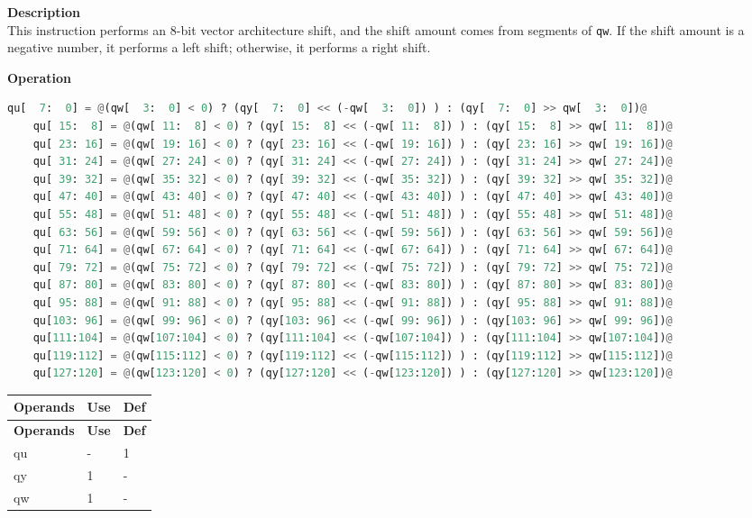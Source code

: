 \textbf{Description}\\
This instruction performs an 8-bit vector architecture shift, and the shift amount comes from segments of \lstinline{qw}. If the shift amount is a negative number, it performs a left shift; otherwise, it performs a right shift.

\textbf{Operation}\\
\begin{lstlisting}[language=Python, escapechar=@]
    qu[  7:  0] = @(qw[  3:  0] < 0) ? (qy[  7:  0] << (-qw[  3:  0]) ) : (qy[  7:  0] >> qw[  3:  0])@
    qu[ 15:  8] = @(qw[ 11:  8] < 0) ? (qy[ 15:  8] << (-qw[ 11:  8]) ) : (qy[ 15:  8] >> qw[ 11:  8])@
    qu[ 23: 16] = @(qw[ 19: 16] < 0) ? (qy[ 23: 16] << (-qw[ 19: 16]) ) : (qy[ 23: 16] >> qw[ 19: 16])@
    qu[ 31: 24] = @(qw[ 27: 24] < 0) ? (qy[ 31: 24] << (-qw[ 27: 24]) ) : (qy[ 31: 24] >> qw[ 27: 24])@
    qu[ 39: 32] = @(qw[ 35: 32] < 0) ? (qy[ 39: 32] << (-qw[ 35: 32]) ) : (qy[ 39: 32] >> qw[ 35: 32])@
    qu[ 47: 40] = @(qw[ 43: 40] < 0) ? (qy[ 47: 40] << (-qw[ 43: 40]) ) : (qy[ 47: 40] >> qw[ 43: 40])@
    qu[ 55: 48] = @(qw[ 51: 48] < 0) ? (qy[ 55: 48] << (-qw[ 51: 48]) ) : (qy[ 55: 48] >> qw[ 51: 48])@
    qu[ 63: 56] = @(qw[ 59: 56] < 0) ? (qy[ 63: 56] << (-qw[ 59: 56]) ) : (qy[ 63: 56] >> qw[ 59: 56])@
    qu[ 71: 64] = @(qw[ 67: 64] < 0) ? (qy[ 71: 64] << (-qw[ 67: 64]) ) : (qy[ 71: 64] >> qw[ 67: 64])@
    qu[ 79: 72] = @(qw[ 75: 72] < 0) ? (qy[ 79: 72] << (-qw[ 75: 72]) ) : (qy[ 79: 72] >> qw[ 75: 72])@
    qu[ 87: 80] = @(qw[ 83: 80] < 0) ? (qy[ 87: 80] << (-qw[ 83: 80]) ) : (qy[ 87: 80] >> qw[ 83: 80])@
    qu[ 95: 88] = @(qw[ 91: 88] < 0) ? (qy[ 95: 88] << (-qw[ 91: 88]) ) : (qy[ 95: 88] >> qw[ 91: 88])@
    qu[103: 96] = @(qw[ 99: 96] < 0) ? (qy[103: 96] << (-qw[ 99: 96]) ) : (qy[103: 96] >> qw[ 99: 96])@
    qu[111:104] = @(qw[107:104] < 0) ? (qy[111:104] << (-qw[107:104]) ) : (qy[111:104] >> qw[107:104])@
    qu[119:112] = @(qw[115:112] < 0) ? (qy[119:112] << (-qw[115:112]) ) : (qy[119:112] >> qw[115:112])@
    qu[127:120] = @(qw[123:120] < 0) ? (qy[127:120] << (-qw[123:120]) ) : (qy[127:120] >> qw[123:120])@
\end{lstlisting}

\begin{longtable}[c]{|l|l|l|}
    \hline
    \rowcolor{lightgray}
    \textbf{Operands} & \textbf{Use} & \textbf{Def} \\\hline
    \endfirsthead
    \rowcolor{lightgray}
     \textbf{Operands} & \textbf{Use} & \textbf{Def} \\\hline
    \endhead
    \endfoot

  qu & - & 1 \\\hline
  qy & 1 & - \\\hline
  qw & 1 & - \\\hline

\end{longtable}


